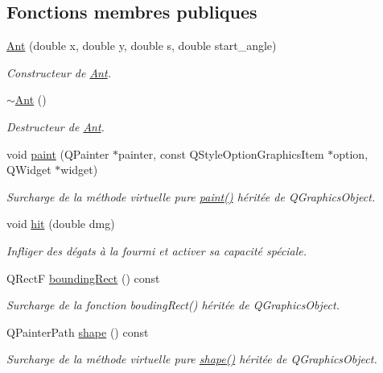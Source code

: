 \subsection*{Fonctions membres publiques}
\begin{DoxyCompactItemize}
\item 
\hyperlink{classAnt_a52f0aed092463606f4d4edd2091d92eb}{Ant} (double x, double y, double s, double start\_\-angle)
\begin{DoxyCompactList}\small\item\em Constructeur de \hyperlink{classAnt}{Ant}. \end{DoxyCompactList}\item 
\hyperlink{classAnt_a33ca6bd592236726a18a2159908e4116}{$\sim$Ant} ()
\begin{DoxyCompactList}\small\item\em Destructeur de \hyperlink{classAnt}{Ant}. \end{DoxyCompactList}\item 
void \hyperlink{classAnt_abb2b56b817ce45d815251549a77402be}{paint} (QPainter $\ast$painter, const QStyleOptionGraphicsItem $\ast$option, QWidget $\ast$widget)
\begin{DoxyCompactList}\small\item\em Surcharge de la méthode virtuelle pure \hyperlink{classAnt_abb2b56b817ce45d815251549a77402be}{paint()} héritée de QGraphicsObject. \end{DoxyCompactList}\item 
void \hyperlink{classAnt_a64b0e0e7d2605c1a5a0906587ab70920}{hit} (double dmg)
\begin{DoxyCompactList}\small\item\em Infliger des dégats à la fourmi et activer sa capacité spéciale. \end{DoxyCompactList}\item 
QRectF \hyperlink{classBug_a9b39c25361faad07b1bf2dd927d09dab}{boundingRect} () const 
\begin{DoxyCompactList}\small\item\em Surcharge de la fonction boudingRect() héritée de QGraphicsObject. \end{DoxyCompactList}\item 
QPainterPath \hyperlink{classBug_a587a36d3145c2b4dba6c689af22c65ac}{shape} () const 
\begin{DoxyCompactList}\small\item\em Surcharge de la méthode virtuelle pure \hyperlink{classBug_a587a36d3145c2b4dba6c689af22c65ac}{shape()} héritée de QGraphicsObject. \end{DoxyCompactList}\item 

\end{DoxyCompactItemize}
